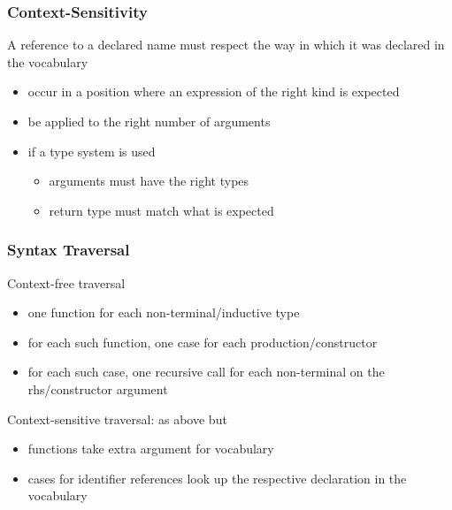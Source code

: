 \begin{frame}\frametitle{Context-Sensitivity}
A reference to a declared name must respect the way in which it was declared in the vocabulary
\begin{itemize}
 \item occur in a position where an expression of the right kind is expected
 \item be applied to the right number of arguments
 \item if a type system is used
  \begin{itemize}
  \item arguments must have the right types
  \item return type must match what is expected
  \end{itemize}
\end{itemize}
\end{frame}

\begin{frame}\frametitle{Syntax Traversal}
Context-free traversal
\begin{itemize}
\item one function for each non-terminal/inductive type 
\item for each such function, one case for each production/constructor
\item for each such case, one recursive call for each non-terminal on the rhs/constructor argument
\end{itemize}

Context-sensitive traversal: as above but
\begin{itemize}
\item functions take extra argument for vocabulary
\item cases for identifier references look up the respective declaration in the vocabulary
\end{itemize}
\end{frame}


